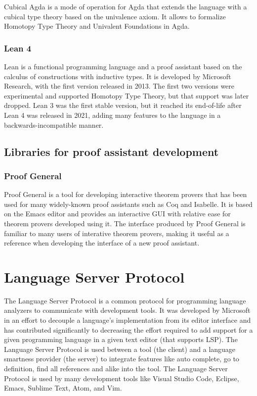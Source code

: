 Cubical Agda \cite{VEZZOSI2021} is a mode of operation for Agda that extends the language with a cubical type theory \cite{Cohen2016} based on the univalence axiom.
It allows to formalize Homotopy Type Theory and Univalent Foundations in Agda.

\subsubsection{Lean 4}

Lean is a functional programming language and a proof assistant based on the calculus of constructions with inductive types.
It is developed by Microsoft Research, with the first version released in 2013.
The first two versions were experimental and supported Homotopy Type Theory, but that support was later dropped.
Lean 3 was the first stable version, but it reached its end-of-life after Lean 4 was released in 2021, adding many features to the language in a backwards-incompatible manner.

\subsection{Libraries for proof assistant development}

\subsubsection{Proof General}

Proof General \cite{Aspinall2000} is a tool for developing interactive theorem
provers that has been used for many widely-known proof assistants such as Coq
and Isabelle.
It is based on the Emacs editor and provides an interactive GUI with relative
ease for theorem provers developed using it.
The interface produced by Proof General is familiar to many users of interative theorem
provers, making it useful as a reference when developing the interface of a new proof assistant.

\section{Language Server Protocol}

The Language Server Protocol is a common protocol for programming language analyzers to communicate with development tools. It was developed by Microsoft in an effort to decouple a language's implementation from its editor interface \cite{Buender2019} and has contributed significantly to decreasing the effort required to add support for a given programming language in a given text editor (that supports LSP). The Language Server Protocol is used between a tool (the client) and a language smartness provider (the server) to integrate features like auto complete, go to definition, find all references and alike into the tool. The Language Server Protocol is used by many development tools like Visual Studio Code, Eclipse, Emacs, Sublime Text, Atom, and Vim.

